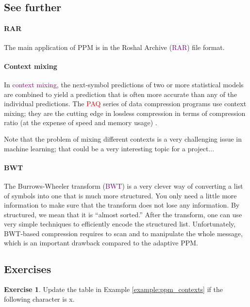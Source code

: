 \documentclass[a4paper, 11pt, openany]{book}
\numberwithin{equation}{section}
\theoremstyle{plain}
\theoremstyle{definition}
\newtheorem{exercise}   {Exercise}  [section]
\newcommand{\Important}[1]{\textcolor{red}{#1}}
\newcommand{\Define}[1]{\textcolor{purple}{#1}}
\begin{document}
\subsection{See further}

\paragraph{RAR} The main application of PPM is in the Roshal Archive (\Define{RAR}) file format. 


\paragraph{Context mixing} In \Define{context mixing}, the next-symbol predictions of two or more statistical models are combined to yield a prediction that is often more accurate than any of the individual predictions. The \Important{PAQ} series of data compression programs use context mixing; they are the cutting edge in lossless compression in terms of compression ratio (at the expense of speed and memory usage) \cite{KF11}. 

Note that the problem of mixing different contexts is a very challenging issue in machine learning; that could be a very interesting topic for a project...


\paragraph{BWT} The Burrows-Wheeler transform (\Define{BWT}) is a very clever way of converting a list of symbols into one that is much more structured. You only need a little more information to make sure that the transform does not lose any information. By structured, we mean that it is ``almost sorted.'' After the transform, one can use very simple techniques to efficiently encode the structured list. Unfortunately, BWT-based compression requires to scan and to manipulate the whole message, which is an important drawback compared to the adaptive PPM.


\subsection{Exercises}


\begin{exercise} \label{exercise:ppm_contexts}
Update the table in Example \ref{example:ppm_contexts} if the following character is x.
\end{exercise}
\end{document}
